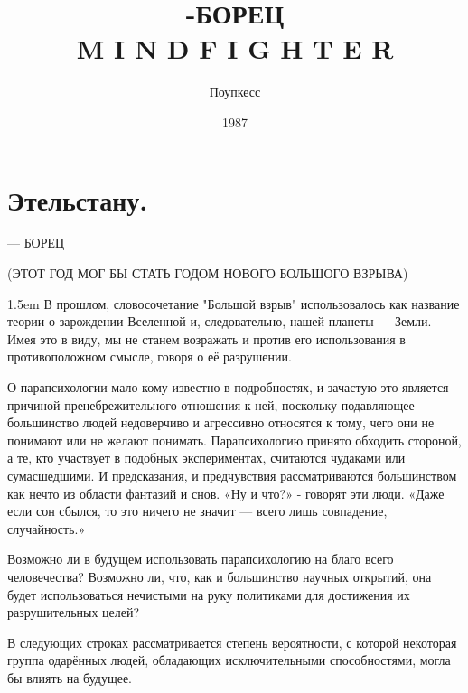 \documentclass[a4paper,12pt]{book}
\begin{document}
\title{\textbf{-БОРЕЦ\\
    \normalsize M I N D F I G H T E R}\vspace{40pt}}
\author{ Поупкесс\vspace{320pt}}
\date{\Large1987}

\maketitle
\tableofcontents

\chapter*{ Этельстану.}
\newpage
\begin{center}
 — БОРЕЦ\\
\end{center}
\par
\noindent(ЭТОТ ГОД МОГ БЫ СТАТЬ ГОДОМ НОВОГО БОЛЬШОГО ВЗРЫВА)\\
\par
\emergencystretch 1.5em
\hfuzz 0.3pt
В прошлом, словосочетание "Большой взрыв" использовалось как название теории о зарождении Вселенной и, следовательно, нашей планеты — Земли. Имея это в виду, мы не станем возражать и против его использования в противоположном смысле, говоря о её разрушении.\\
\par
О парапсихологии мало кому известно в подробностях, и зачастую это является причиной пренебрежительного отношения к ней, поскольку подавляющее большинство людей недоверчиво и агрессивно относятся к тому, чего они не понимают или не желают понимать. Парапсихологию принято обходить стороной, а те, кто участвует в подобных экспериментах, считаются чудаками или сумасшедшими. И предсказания, и предчувствия рассматриваются большинством как нечто из области фантазий и снов. «Ну и что?» - говорят эти люди. «Даже если сон сбылся, то это ничего не значит — всего лишь совпадение, случайность.»\\
\par
Возможно ли в будущем использовать парапсихологию на благо всего человечества? Возможно ли, что, как и большинство научных открытий, она будет использоваться нечистыми на руку политиками для достижения их разрушительных целей?\\
\par
В следующих строках рассматривается степень вероятности, с которой некоторая группа одарённых людей, обладающих исключительными способностями, могла бы влиять на будущее.\\
\end{document}
